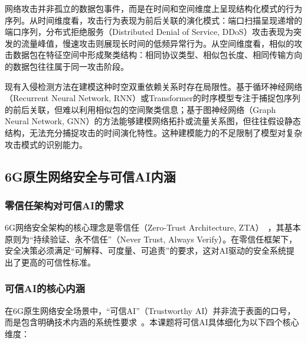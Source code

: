 网络攻击并非孤立的数据包事件，而是在时间和空间维度上呈现结构化模式的行为序列。从时间维度看，攻击行为表现为前后关联的演化模式：端口扫描呈现递增的端口序列，分布式拒绝服务（Distributed Denial of Service, DDoS）攻击表现为突发的流量峰值，慢速攻击则展现长时间的低频异常行为。从空间维度看，相似的攻击数据包在特征空间中形成聚类结构：相同协议类型、相似包长度、相同传输方向的数据包往往属于同一攻击阶段。

现有入侵检测方法在建模这种时空双重依赖关系时存在局限性。基于循环神经网络（Recurrent Neural Network, RNN）或Transformer的时序模型专注于捕捉包序列的前后关联，但难以利用相似包的空间聚类信息；基于图神经网络（Graph Neural Network, GNN）的方法能够建模网络拓扑或流量关系图，但往往假设静态结构，无法充分捕捉攻击的时间演化特性。这种建模能力的不足限制了模型对复杂攻击模式的识别能力。

\subsection{6G原生网络安全与可信AI内涵}

\subsubsection{零信任架构对可信AI的需求}

6G网络安全架构的核心理念是零信任（Zero-Trust Architecture, ZTA）~\cite{NIST-ZTA}，其基本原则为``持续验证、永不信任''（Never Trust, Always Verify）。在零信任框架下，安全决策必须满足``可解释、可度量、可追责''的要求，这对AI驱动的安全系统提出了更高的可信性标准。

\subsubsection{可信AI的核心内涵}

在6G原生网络安全场景中，“可信AI”（Trustworthy AI）并非流于表面的口号，而是包含明确技术内涵的系统性要求~\cite{Afroogh2024TrustAI}。本课题将可信AI具体细化为以下四个核心维度：

